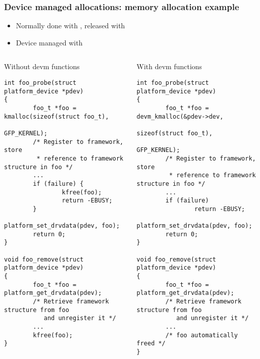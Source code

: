 \begin{frame}[fragile]
  \frametitle{Device managed allocations: memory allocation example}
  \begin{itemize}
  \item Normally done with , released
    with 
  \item Device managed with 
  \end{itemize}

  \begin{columns}
    \begin{block}{Without devm functions}
\fontsize{6}{6}\selectfont
    \begin{verbatim}
int foo_probe(struct platform_device *pdev)
{
        foo_t *foo = kmalloc(sizeof(struct foo_t),
                                    GFP_KERNEL);
        /* Register to framework, store
         * reference to framework structure in foo */
        ...
        if (failure) {
                kfree(foo);
                return -EBUSY;
        }
        platform_set_drvdata(pdev, foo);
        return 0;
}

void foo_remove(struct platform_device *pdev)
{
        foo_t *foo = platform_get_drvdata(pdev);
        /* Retrieve framework structure from foo
           and unregister it */
        ...
        kfree(foo);
}
    \end{verbatim}
  \end{block}
    \begin{block}{With devm functions}
\fontsize{6}{6}\selectfont
    \begin{verbatim}
int foo_probe(struct platform_device *pdev)
{
        foo_t *foo = devm_kmalloc(&pdev->dev,
                           sizeof(struct foo_t),
                           GFP_KERNEL);
        /* Register to framework, store
         * reference to framework structure in foo */
        ...
        if (failure)
                return -EBUSY;
        platform_set_drvdata(pdev, foo);
        return 0;
}

void foo_remove(struct platform_device *pdev)
{
        foo_t *foo = platform_get_drvdata(pdev);
        /* Retrieve framework structure from foo
           and unregister it */
        ...
        /* foo automatically freed */
}
    \end{verbatim}
  \end{block}
\end{columns}

\end{frame}

